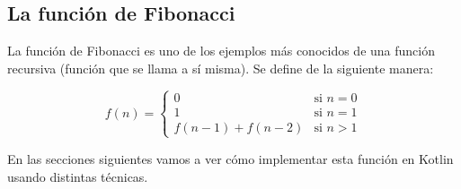 \subsection{La función de Fibonacci}
  \label{subsec:La_funcion_de_Fibonacci}

  La función de Fibonacci es uno de los ejemplos más conocidos de una función recursiva (función 
  que se llama a sí misma). 
  Se define de la siguiente manera:

  \begin{equation}
    \label{eq:Funcion_de_Fibonacci}
    f(n) = \begin{cases}
      0 & \text{si } n = 0 \\
      1 & \text{si } n = 1 \\
      f(n - 1) + f(n - 2) & \text{si } n > 1
    \end{cases}
  \end{equation}

  En las secciones siguientes vamos a ver cómo implementar esta función en Kotlin usando distintas
  técnicas.